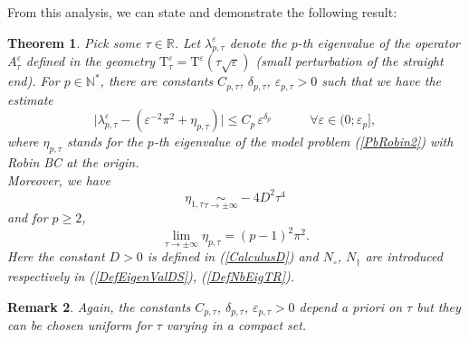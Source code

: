 \documentclass[11pt,a4paper]{article}
\newcommand{\eps}{\varepsilon}
\newcommand{\N}{\mathbb{N}}
\newcommand{\R}{\mathbb{R}}
\newtheorem{theorem}{Theorem}[section]
\newtheorem{remark}[theorem]{Remark}
\begin{document}
\noindent From this analysis, we can state and demonstrate the following result:
\begin{theorem}\label{ThmModel2}
Pick some $\tau\in\R$. Let $\lambda^\eps_{p,\tau}$ denote the $p$-th eigenvalue of the operator $A^\eps_\tau$ defined in the geometry $\mathrm{T}^\eps_\tau=\mathrm{T}^\eps(\tau\sqrt{\eps})$ (small perturbation of the straight end). For $p\in\N^{\ast}$, there are  constants $C_{p,\tau}$, $\delta_{p,\tau}$, $\eps_{p,\tau}>0$ such that we have the estimate 
\[
\big|\lambda^\eps_{p,\tau}-(\eps^{-2}\pi^2+\eta_{p,\tau})\big|\le C_p\,\eps^{\delta_p}\qquad\quad\forall\eps\in(0;\eps_p],
\]
where $\eta_{p,\tau}$ stands for the $p$-th eigenvalue of the model problem (\ref{PbRobin2}) with Robin BC at the origin.\\
[5pt]
Moreover, we have
\begin{equation}\label{FormulaModel2a}
\eta_{1,\tau}\underset{\tau\to\pm\infty}{\sim}-4D^2\tau^4
\end{equation}
and for $p\ge2$,
\begin{equation}\label{FormulaModel2b}
\lim_{\tau\to\pm\infty}\eta_{p,\tau}=(p-1)^2\pi^2.
\end{equation}
Here the constant $D>0$ is defined in (\ref{CalculusD}) and $N_\circ$, $N_\dagger$ are introduced respectively in (\ref{DefEigenValDS}), (\ref{DefNbEigTR}).
\end{theorem}
\begin{remark}
Again, the constants $C_{p,\tau}$, $\delta_{p,\tau}$, $\eps_{p,\tau}>0$ depend \textit{a priori} on $\tau$ but they can be chosen uniform for $\tau$ varying in a compact set.
\end{remark}
\end{document}
